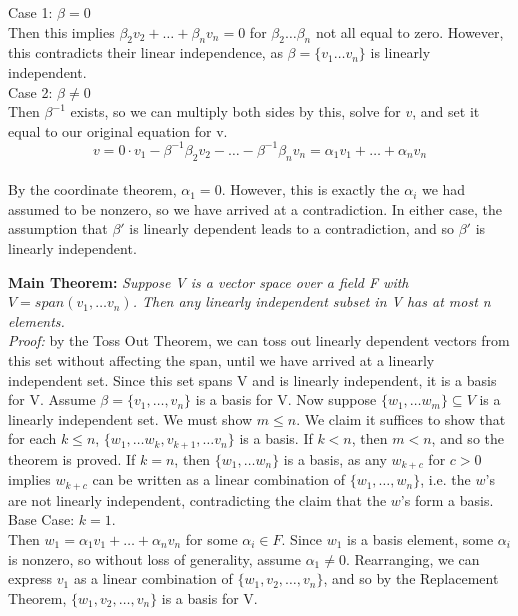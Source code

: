 \documentclass[12pt]{article}
\begin{document}
Case 1: $\beta = 0$\\
Then this implies $\beta_2 v_2 + \dots + \beta_n v_n = 0$ for $\beta_2 \dots \beta_n$ not all equal to zero. However, this contradicts their linear independence, as $\beta = \{ v_1 \dots v_n\}$ is linearly independent.\\

Case 2: $\beta \neq 0$\\
Then $\beta^{-1}$ exists, so we can multiply both sides by this, solve for $v$, and set it equal to our original equation for v.
$$v = 0 \cdot v_1 -\beta^{-1} \beta_2 v_2 - \dots - \beta^{-1} \beta_n v_n = \alpha_1 v_1 + \dots + \alpha_n v_n$$\\
By the coordinate theorem, $\alpha_1 = 0$. However, this is exactly the $\alpha_i$ we had assumed to be nonzero, so we have arrived at a contradiction. In either case, the assumption that $\beta'$ is linearly dependent leads to a contradiction, and so $\beta'$ is linearly independent.

\textbf{Main Theorem: }\emph{Suppose V is a vector space over a field F with $V = span(v_1,\dots v_n)$. Then any linearly independent subset in V has at most n elements.}\\

\emph{Proof: }by the Toss Out Theorem, we can toss out linearly dependent vectors from this set without affecting the span, until we have arrived at a linearly independent set. Since this set spans V and is linearly independent, it is a basis for V. Assume $\beta = \{ v_1, \dots, v_n \}$ is a basis for V. Now suppose $\{ w_1, \dots w_m \} \subseteq V$ is a linearly independent set. We must show $m \leq n$. We claim it suffices to show that for each $k \leq n$, $\{ w_1, \dots w_k, v_{k + 1}, \dots v_n \}$ is a basis. If $k < n$, then $m < n$, and so the theorem is proved. If $k = n$, then $\{ w_1, \dots w_n \}$ is a basis, as any $w_{k + c}$ for $c > 0$ implies $w_{k + c}$ can be written as a linear combination of $\{ w_1, \dots, w_n \}$, i.e. the $w$'s are not linearly independent, contradicting the claim that the $w$'s form a basis.\\

Base Case: $k = 1$.\\
Then $w_1 = \alpha_1 v_1 + \dots + \alpha_n v_n$ for some $\alpha_i \in F$. Since $w_1$ is a basis element, some $\alpha_i$ is nonzero, so without loss of generality, assume $\alpha_1 \neq 0$. Rearranging, we can express $v_1$ as a linear combination of $\{ w_1, v_2, \dots, v_n \}$, and so by the Replacement Theorem, $\{ w_1, v_2, \dots, v_n \}$ is a basis for V.\\
\end{document}
